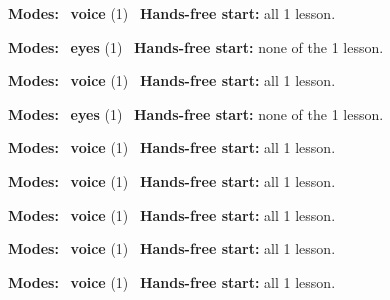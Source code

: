 \expandafter\def\csname hlchaptermodality240\endcsname{%
  {\small\noindent
    \textbf{Modes:} \hlvoicesign{}~\textbf{voice} (1)\quad
    \hlvoicesign{}~\textbf{Hands-free start:} all 1 lesson.%
    \par}\medskip
}

\expandafter\def\csname hlchaptermodality241\endcsname{%
  {\small\noindent
    \textbf{Modes:} \hlsightsign{}~\textbf{eyes} (1)\quad
    \hlvoicesign{}~\textbf{Hands-free start:} none of the 1 lesson.%
    \par}\medskip
}

\expandafter\def\csname hlchaptermodality242\endcsname{%
  {\small\noindent
    \textbf{Modes:} \hlvoicesign{}~\textbf{voice} (1)\quad
    \hlvoicesign{}~\textbf{Hands-free start:} all 1 lesson.%
    \par}\medskip
}

\expandafter\def\csname hlchaptermodality243\endcsname{%
  {\small\noindent
    \textbf{Modes:} \hlsightsign{}~\textbf{eyes} (1)\quad
    \hlvoicesign{}~\textbf{Hands-free start:} none of the 1 lesson.%
    \par}\medskip
}

\expandafter\def\csname hlchaptermodality244\endcsname{%
  {\small\noindent
    \textbf{Modes:} \hlvoicesign{}~\textbf{voice} (1)\quad
    \hlvoicesign{}~\textbf{Hands-free start:} all 1 lesson.%
    \par}\medskip
}

\expandafter\def\csname hlchaptermodality245\endcsname{%
  {\small\noindent
    \textbf{Modes:} \hlvoicesign{}~\textbf{voice} (1)\quad
    \hlvoicesign{}~\textbf{Hands-free start:} all 1 lesson.%
    \par}\medskip
}

\expandafter\def\csname hlchaptermodality246\endcsname{%
  {\small\noindent
    \textbf{Modes:} \hlvoicesign{}~\textbf{voice} (1)\quad
    \hlvoicesign{}~\textbf{Hands-free start:} all 1 lesson.%
    \par}\medskip
}

\expandafter\def\csname hlchaptermodality247\endcsname{%
  {\small\noindent
    \textbf{Modes:} \hlvoicesign{}~\textbf{voice} (1)\quad
    \hlvoicesign{}~\textbf{Hands-free start:} all 1 lesson.%
    \par}\medskip
}

\expandafter\def\csname hlchaptermodality248\endcsname{%
  {\small\noindent
    \textbf{Modes:} \hlvoicesign{}~\textbf{voice} (1)\quad
    \hlvoicesign{}~\textbf{Hands-free start:} all 1 lesson.%
    \par}\medskip
}

